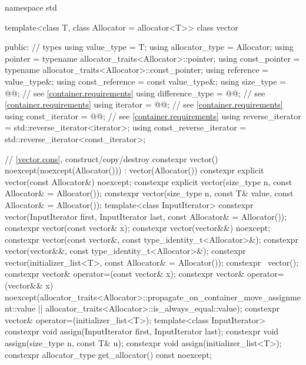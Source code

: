 \begin{codeblock}
namespace std {
  template<class T, class Allocator = allocator<T>>
  class vector {
  public:
    // types
    using value_type             = T;
    using allocator_type         = Allocator;
    using pointer                = typename allocator_traits<Allocator>::pointer;
    using const_pointer          = typename allocator_traits<Allocator>::const_pointer;
    using reference              = value_type&;
    using const_reference        = const value_type&;
    using size_type              = @@; // see \ref{container.requirements}
    using difference_type        = @@; // see \ref{container.requirements}
    using iterator               = @@; // see \ref{container.requirements}
    using const_iterator         = @@; // see \ref{container.requirements}
    using reverse_iterator       = std::reverse_iterator<iterator>;
    using const_reverse_iterator = std::reverse_iterator<const_iterator>;

    // \ref{vector.cons}, construct/copy/destroy
    constexpr vector() noexcept(noexcept(Allocator())) : vector(Allocator()) { }
    constexpr explicit vector(const Allocator&) noexcept;
    constexpr explicit vector(size_type n, const Allocator& = Allocator());
    constexpr vector(size_type n, const T& value, const Allocator& = Allocator());
    template<class InputIterator>
      constexpr vector(InputIterator first, InputIterator last, const Allocator& = Allocator());
    constexpr vector(const vector& x);
    constexpr vector(vector&&) noexcept;
    constexpr vector(const vector&, const type_identity_t<Allocator>&);
    constexpr vector(vector&&, const type_identity_t<Allocator>&);
    constexpr vector(initializer_list<T>, const Allocator& = Allocator());
    constexpr ~vector();
    constexpr vector& operator=(const vector& x);
    constexpr vector& operator=(vector&& x)
      noexcept(allocator_traits<Allocator>::propagate_on_container_move_assignment::value ||
               allocator_traits<Allocator>::is_always_equal::value);
    constexpr vector& operator=(initializer_list<T>);
    template<class InputIterator>
      constexpr void assign(InputIterator first, InputIterator last);
    constexpr void assign(size_type n, const T& u);
    constexpr void assign(initializer_list<T>);
    constexpr allocator_type get_allocator() const noexcept;

}}
\end{codeblock}
